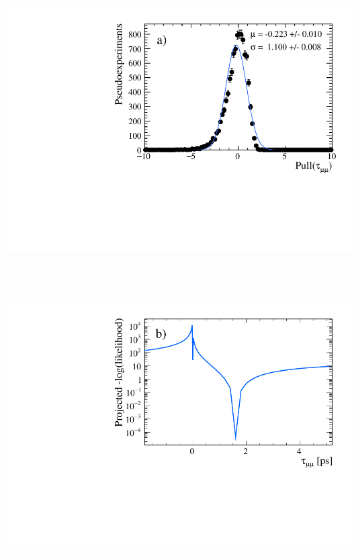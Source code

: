 \begin{figure}[tbp]
    \centering
   \begin{subfigure}[b]{0.48\textwidth}
        \includegraphics[width= \textwidth]{./Figs/LifetimeMeasurement/CKM_simple_tau_pull.pdf}
    \end{subfigure}
   ~ %
    \begin{subfigure}[b]{0.48\textwidth}
       \includegraphics[width=\textwidth]{./Figs/LifetimeMeasurement/tau_LL.pdf}

\end{subfigure}
\end{figure}
